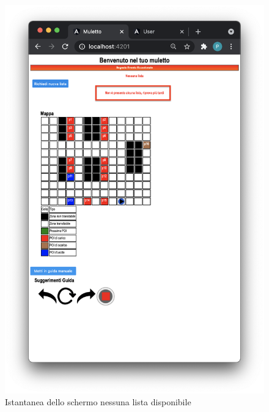 \begin{itemize}
\begin{figure}[H]
        \centering
        \includegraphics[scale=0.45]{res/images/nolist.png}
        \caption{Istantanea dello schermo nessuna lista disponibile}
    \end{figure}
\end{itemize}



